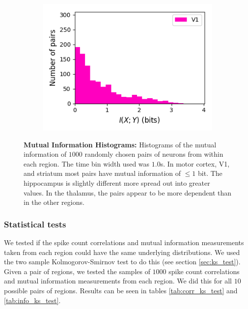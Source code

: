 \documentclass[a4paper,12pt]{article}
\theoremstyle{definition}
\begin{document}
\begin{figure}[p]
\begin{subfigure}{0.5\textwidth}
    \includegraphics[width=\textwidth]{figures/all_v1_8_1p0_information_histogram.png}
  \end{subfigure}
  \caption{\textbf{Mutual Information Histograms:} Histograms of the mutual information of $1000$ randomly chosen pairs of neurons from within each region. The time bin width used was $1.0$s. In motor cortex, V1, and striatum most pairs have mutual information of $\leq 1$ bit. The hippocampus is slightly different more spread out into greater values. In the thalamus, the pairs appear to be more dependent than in the other regions.}
  \label{fig:all_info_histograms}
\end{figure}

\subsubsection{Statistical tests}
We tested if the spike count correlations and mutual information measurements taken from each region could have the same underlying distributions. We used the two sample Kolmogorov-Smirnov test to do this (see section \ref{sec:ks_test}). Given a pair of regions, we tested the samples of $1000$ spike count correlations and mutual information measurements from each region. We did this for all $10$ possible pairs of regions. Results can be seen in tables \ref{tab:corr_ks_test} and \ref{tab:info_ks_test}.
\end{document}
